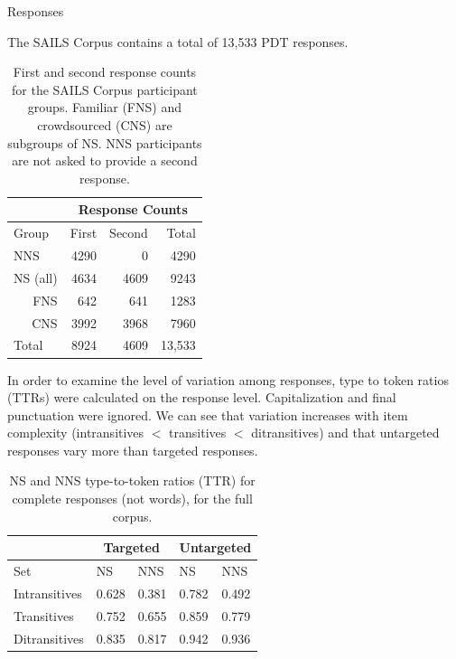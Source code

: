 \documentclass[final,t]{beamer}
\begin{document}
\begin{frame}{}
\begin{columns}[t]
\begin{column}{.33\linewidth}
\begin{block}{Responses}
\begin{center}
\begin{minipage}{.85\textwidth}

The SAILS Corpus contains a total of 13,533 PDT responses.
\vspace{.5em}
\begin{table}[htb!]
\begin{center}
\begin{tabular}{|l||r|r||r|}
\hline
& \multicolumn{3}{|c|}{Response Counts} \\
\hline
 Group & First & Second & Total \\
\hline
\hline
NNS & 4290 & 0 & 4290 \\
\hline
\hline
NS (all) & 4634 & 4609 & 9243 \\ 
\hline
\multicolumn{1}{|r||}{FNS} & 642 & 641 & 1283 \\ 
\hline
\multicolumn{1}{|r||}{CNS} & 3992 & 3968 & 7960 \\
\hline
\hline
Total & 8924 & 4609 & 13,533 \\
\hline
\end{tabular}
\caption{\label{tab:response-counts} First and second response counts for the SAILS Corpus participant groups. Familiar (FNS) and crowdsourced (CNS) are subgroups of NS. NNS participants are not asked to provide a second response.}
\end{center}
\end{table}

\vspace{1em}
In order to examine the level of variation among responses, type to token ratios (TTRs) were calculated on the response level. Capitalization and final punctuation were ignored. We can see that variation increases with item complexity (intransitives $<$ transitives $<$ ditransitives) and that untargeted responses vary more than targeted responses.
\vspace{.5em}
\begin{table}[h!]
\begin{center}
\begin{tabular}{|l||l|l||l|l|}
\hline
 & \multicolumn{2}{|c||}{Targeted} & \multicolumn{2}{|c|}{Untargeted} \\
\hline
 Set & NS & NNS & NS & NNS \\
\hline
\hline
Intransitives & 0.628 & 0.381 & 0.782 & 0.492 \\
\hline
Transitives & 0.752 & 0.655 & 0.859 & 0.779 \\
\hline
Ditransitives & 0.835 & 0.817 & 0.942 & 0.936 \\ 
\hline
\end{tabular}
\caption{\label{tab:ttr} NS and NNS type-to-token ratios (TTR) for complete responses (not words), for the full corpus.}
\end{center}
\end{table}


\end{minipage}
\end{center}
\end{block}
\end{column}
\end{columns}
\end{frame}
\end{document}
